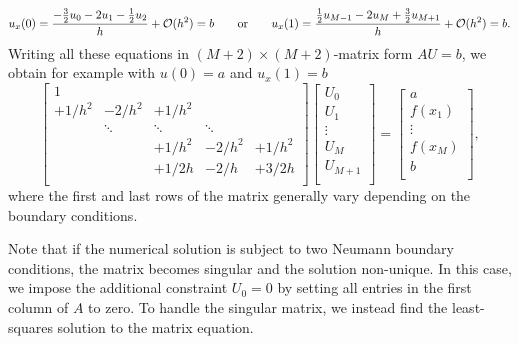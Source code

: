 \begin{equation*}
u_x(0) = \frac{-\frac{3}{2}u_{0}-2u_1-\frac{1}{2}u_{2}}{h} + \mathcal{O}(h^2) = b \qquad \text{or} \qquad u_x(1) = \frac{\frac{1}{2}u_{M-1}-2u_M+\frac{3}{2}u_{M+1}}{h} + \mathcal{O}(h^2) = b.
\end{equation*}
Writing all these equations in $(M+2) \times (M+2)$-matrix form $AU=b$, we obtain for example with $u(0) = a$ and $u_x(1) = b$
\begin{equation}
\renewcommand{\arraystretch}{1.5} %
\begin{bmatrix}
1 \\
+1/h^2 & -2/h^2 & +1/h^2 &   \\
  & \ddots & \ddots & \ddots & \\
  &   & +1/h^2 & -2/h^2 & +1/h^2 \\
  &   & +1/2h & -2/h & +3/2h \\
\end{bmatrix}
\begin{bmatrix}
U_0 \\ U_1 \\ \vdots \\ U_M \\ U_{M+1} \\
\end{bmatrix}
=
\begin{bmatrix}
a \\ f(x_1) \\ \vdots \\ f(x_M) \\ b \\
\end{bmatrix}
,
\label{matrix_system}
\end{equation}
where the first and last rows of the matrix generally vary depending on the boundary conditions.

Note that if the numerical solution is subject to two Neumann boundary conditions, the matrix becomes singular and the solution non-unique.
In this case, we impose the additional constraint $U_0 = 0$ by setting all entries in the first column of $A$ to zero.
To handle the singular matrix, we instead find the least-squares solution to the matrix equation. \cite{numpy_lstsq}

